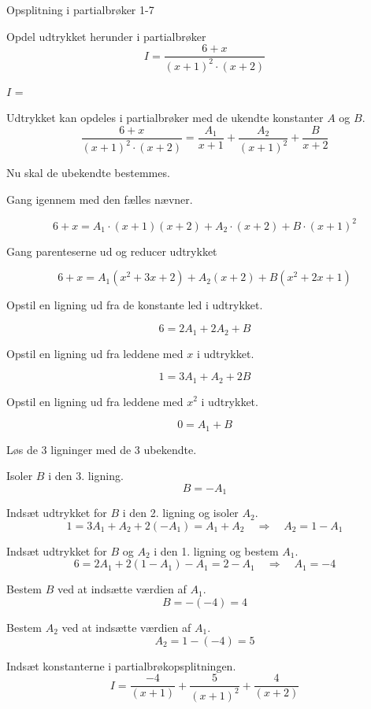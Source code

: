 \documentclass{article}
\begin{document}
\begin{exercise}{Opsplitning i partialbrøker 1-7}

Opdel udtrykket herunder i partialbrøker
\[
I = \frac{6 + x}{(x + 1)^2 \cdot (x + 2)}
\]

$I$ = 

\hint
Udtrykket kan opdeles i partialbrøker med de ukendte konstanter $A$ og $B$.
\[
\frac{6 + x}{(x + 1)^2 \cdot (x + 2)} =
\frac{A_1}{x + 1} + \frac{A_2}{(x + 1)^2} + \frac{B}{x + 2}
\]

\hint
Nu skal de ubekendte bestemmes.

\hint
Gang igennem med den fælles nævner.

\hint
\[
6 + x = A_1 \cdot (x + 1)(x + 2) + A_2 \cdot (x + 2) + B \cdot (x + 1)^2
\]

\hint
Gang parenteserne ud og reducer udtrykket

\hint
\[
6 + x = A_1(x^2 + 3x + 2) + A_2(x + 2) + B(x^2 + 2x + 1)
\]

\hint
Opstil en ligning ud fra de konstante led i udtrykket.

\hint
\[
6 = 2A_1 + 2A_2 + B
\]

\hint
Opstil en ligning ud fra leddene med $x$ i udtrykket.

\hint
\[
1 = 3A_1 + A_2 + 2B
\]

\hint
Opstil en ligning ud fra leddene med $x^2$ i udtrykket.

\hint
\[
0 = A_1 + B
\]

\hint
Løs de 3 ligninger med de 3 ubekendte.

\hint
Isoler $B$ i den 3. ligning.
\[
B = -A_1
\]

\hint
Indsæt udtrykket for $B$ i den 2. ligning og isoler $A_2$.
\[
1 = 3A_1 + A_2 + 2(-A_1) = A_1 + A_2 \quad\Rightarrow \quad A_2 = 1 - A_1
\]

\hint
Indsæt udtrykket for $B$ og $A_2$ i den 1. ligning og bestem $A_1$.
\[
6 = 2 A_1 + 2(1 - A_1) -A_1 = 2 - A_1\quad \Rightarrow \quad A_1 = -4
 \]

\hint
Bestem $B$ ved at indsætte værdien af $A_1$.
\[
B = - (-4) = 4
\]

\hint
Bestem $A_2$ ved at indsætte værdien af $A_1$.
\[
A_2 = 1 - (-4) = 5
\]

\hint
Indsæt konstanterne i partialbrøkopsplitningen.
\[
I = \frac{-4}{(x + 1)} + \frac{5}{(x + 1)^2} + \frac{4}{(x + 2)}
\]



\end{exercise}
\end{document}
